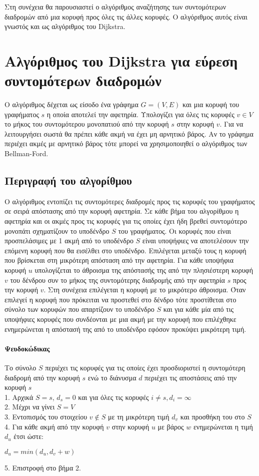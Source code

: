 Στη συνέχεια θα παρουσιαστεί ο αλγόριθμος αναζήτησης των συντομότερων διαδρομών από μια κορυφή προς όλες τις άλλες κορυφές. Ο αλγόριθμος αυτός είναι γνωστός και ως αλγόριθμος του Dijkstra.
 
\section{Αλγόριθμος του Dijkstra για εύρεση συντομότερων διαδρομών}
Ο αλγόριθμος δέχεται ως είσοδο ένα γράφημα $G=(V,E)$ και μια κορυφή του γραφήματος $s$ η οποία αποτελεί την αφετηρία. Υπολογίζει για όλες τις κορυφές $v \in V$ το μήκος του συντομότερου μονοπατιού από την κορυφή $s$ στην κορυφή $v$. Για να λειτουργήσει σωστά θα πρέπει κάθε ακμή να έχει μη αρνητικό βάρος. Αν το γράφημα περιέχει ακμές με αρνητικό βάρος τότε μπορεί να χρησιμοποιηθεί ο αλγόριθμος των Bellman-Ford.

\subsection{Περιγραφή του αλγορίθμου}
Ο αλγόριθμος εντοπίζει τις συντομότερες διαδρομές προς τις κορυφές του γραφήματος σε σειρά απόστασης από την κορυφή αφετηρία. Σε κάθε βήμα του αλγορίθμου η αφετηρία και οι ακμές προς τις κορυφές για τις οποίες έχει ήδη βρεθεί συντομότερο μονοπάτι σχηματίζουν το υποδένδρο $S$ του γραφήματος. Οι κορυφές που είναι προσπελάσιμες με 1 ακμή από το υποδένδρο $S$ είναι υποψήφιες να αποτελέσουν την επόμενη κορυφή που θα εισέλθει στο υποδένδρο. Επιλέγεται μεταξύ τους η κορυφή που βρίσκεται στη μικρότερη απόσταση από την αφετηρία. Για κάθε υποψήφια κορυφή $u$ υπολογίζεται το άθροισμα της απόστασής της από την πλησιέστερη κορυφή $v$ του δένδρου συν το μήκος της συντομότερης διαδρομής από την αφετηρία $s$ προς την κορυφή $v$. Στη συνέχεια επιλέγεται η κορυφή με το μικρότερο άθροισμα. Όταν επιλεγεί η κορυφή που πρόκειται να προστεθεί στο δένδρο τότε προστίθεται στο σύνολο των κορυφών που απαρτίζουν το υποδένδρο $S$  και για κάθε μία από τις υποψήφιες κορυφές που συνδέονται με μια ακμή με την κορυφή που επιλέχθηκε ενημερώνεται η απόστασή της από το υποδένδρο εφόσον προκύψει μικρότερη τιμή.

\paragraph{Ψευδοκώδικας}
Το σύνολο $S$ περιέχει τις κορυφές για τις οποίες έχει προσδιοριστεί η συντομότερη διαδρομή από την κορυφή $s$ ενώ το διάνυσμα $d$ περιέχει τις αποστάσεις από την κορυφή $s$ \\
1. Αρχικά $S={s}$, $d_s=0$ και για όλες τις κορυφές $i \neq s, d_i=\infty$ \\
2. Μέχρι να γίνει $S=V$ \\
3. Εντοπισμός του στοιχείου $v \notin S$ με τη μικρότερη τιμή $d_v$ και προσθήκη του στο $S$ \\
4. Για κάθε ακμή από την κορυφή $v$ στην κορυφή $u$ με βάρος $w$ ενημερώνεται η τιμή $d_u$ έτσι ώστε: \\
\centerline{$d_u=min(d_u, d_v+w)$}
5. Επιστροφή στο βήμα 2.

